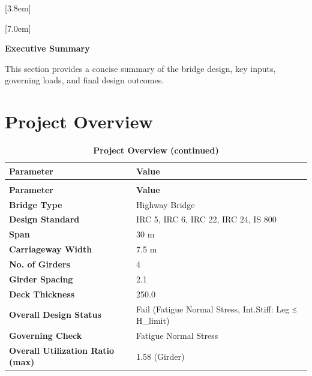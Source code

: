 \documentclass[12pt,a4paper]{report}
\numberwithin{table}{chapter}
\numberwithin{figure}{chapter}
\begin{document}
[3.8em]
  {\normalfont}
  {\contentslabel{2.3em}}
  {\hspace*{-2.3em}}
  {\hfill\contentspage}

[7.0em]
  {\normalfont}
  {\contentslabel{3.2em}}
  {\hspace*{-3.2em}}
  {\hfill\contentspage}

\newpage
\renewcommand{\contentsname}{\centering\Large\bfseries Table of Contents}
\tableofcontents


\newpage
{\centering\Large\bfseries Executive Summary\par}
\vspace{0.8em}

This section provides a concise summary of the bridge design, key inputs, governing loads, and final design outcomes.

\section*{Project Overview}
\label{sec:project-overview}

\begin{longtable}{|L{5.5cm}|L{8.5cm}|}
\caption{\textbf{Project Overview}}\\
\hline
\textbf{Parameter} & \textbf{Value} \\[6pt]
\hline
\endfirsthead
\caption[]{\textbf{Project Overview (continued)}}\\
\hline
\textbf{Parameter} & \textbf{Value} \\[6pt]
\hline
\endhead
\hline
\endfoot
\endlastfoot

\textbf{Bridge Type} & Highway Bridge \\[6pt]
\hline
\textbf{Design Standard} & IRC 5, IRC 6, IRC 22, IRC 24, IS 800 \\[6pt]
\hline
\textbf{Span} & 30 m \\[6pt]
\hline
\textbf{Carriageway Width} & 7.5 m \\[6pt]
\hline
\textbf{No. of Girders} & 4 \\[6pt]
\hline
\textbf{Girder Spacing} & 2.1 \\[6pt]
\hline
\textbf{Deck Thickness} & 250.0 \\[6pt]
\hline
\textbf{Overall Design Status} & Fail (Fatigue Normal Stress, Int.Stiff:\allowbreak{} Leg ≤ H\_\allowbreak{}limit) \\[6pt]
\hline
\textbf{Governing Check} & Fatigue Normal Stress \\[6pt]
\hline
\textbf{Overall Utilization Ratio (max)} & 1.58 (Girder) \\[6pt]
\hline
\end{longtable}
\end{document}
